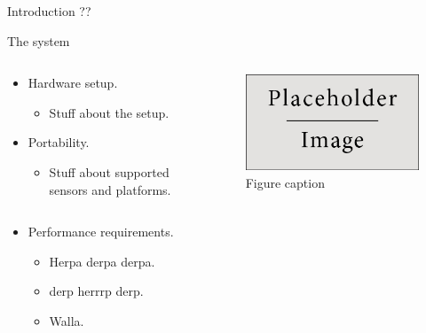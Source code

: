 \documentclass[final,hyperref={pdfpagelabels=false}]{beamer}
\begin{document}
\begin{frame}[t]
\begin{columns}[t]
\begin{column}{.465\textwidth}
\begin{block}{Introduction ??}
\end{block}


\begin{block}{The system}

\begin{columns} %
\begin{column}{.54\textwidth} %
\begin{itemize}
\item Hardware setup.
\begin{itemize}
\item Stuff about the setup.
\end{itemize}
\item Portability.
\begin{itemize}
\item Stuff about supported sensors and platforms.
\end{itemize}
\end{itemize}
\end{column}

\begin{column}{.43\textwidth} %
\centering
\begin{figure}
\includegraphics[width=0.8\linewidth]{placeholder.jpg}
\caption{Figure caption}
\end{figure}
\end{column}
\end{columns} %

\begin{itemize}
\item Performance requirements.
\begin{itemize}
\item Herpa derpa derpa.
\item derp herrrp derp.
\item Walla.
\end{itemize}
\end{itemize}


\end{block}
\end{column}
\end{columns}
\end{frame}
\end{document}

